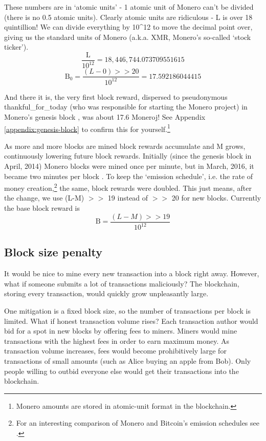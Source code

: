 These numbers are in `atomic units' - 1 atomic unit of Monero can't be divided (there is no 0.5 atomic units). Clearly atomic units are ridiculous - L is over 18 quintillion! We can divide everything by 10\^{}12 to move the decimal point over, giving us the standard units of Monero (a.k.a. XMR, Monero's so-called `stock ticker').\vspace{.15cm}
\[ \frac{\textrm{L}}{10^{12}} = 18,446,744.073709551615 \]
\[ \textrm{B}_0 = \frac{(L-0) >> 20}{10^{12}} = 17.592186044415 \]

And there it is, the very first block reward, dispersed to pseudonymous thankful\_for\_today (who was responsible for starting the Monero project) in Monero's genesis block \cite{bitmonero-launched}, was about 17.6 Moneroj! See Appendix \ref{appendix:genesis-block} to confirm this for yourself.\footnote{Monero amounts are stored in atomic-unit format in the blockchain.}

As more and more blocks are mined block rewards accumulate and M grows, continuously lowering future block rewards. Initially (since the genesis block in April, 2014) Monero blocks were mined once per minute, but in March, 2016, it became two minutes per block \cite{monero-0.9.3}. To keep the `emission schedule', i.e. the rate of money creation,\footnote{For an interesting comparison of Monero and Bitcoin's emission schedules see \cite{monero-coin-emission}.} the same, block rewards were doubled. This just means, after the change, we use (L-M) $>>$ 19 instead of $>>$ 20 for new blocks. Currently the base block reward is
\[ \textrm{B} = \frac{(L-M) >> 19}{10^{12}} \]


\subsection{Block size penalty}
\label{subsec:penalty}

It would be nice to mine every new transaction into a block right away. However, what if someone submits a lot of transactions maliciously? The blockchain, storing every transaction, would quickly grow unpleasantly large. 

One mitigation is a fixed block size, so the number of transactions per block is limited. What if honest transaction volume rises? Each transaction author would bid for a spot in new blocks by offering fees to miners. Miners would mine transactions with the highest fees in order to earn maximum money. As transaction volume increases, fees would become prohibitively large for transactions of small amounts (such as Alice buying an apple from Bob). Only people willing to outbid everyone else would get their transactions into the blockchain.\\

